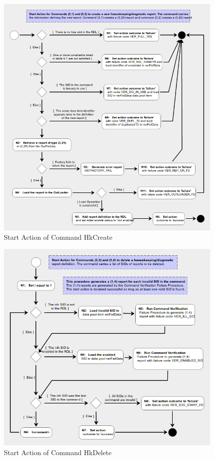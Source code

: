 \documentclass[a4paper,10pt]{article}
\begin{document}
\begin{figure}[H]
 \centering
 \includegraphics[scale=0.55,keepaspectratio=true]{CrPsCmd3s1Start.png}
 \caption{Start Action of Command HkCreate}
 \label{fig:Cmd3s1Start}
\end{figure}

\begin{figure}[H]
 \centering
 \includegraphics[scale=0.55,keepaspectratio=true]{CrPsCmd3s3Start.png}
 \caption{Start Action of Command HkDelete}
 \label{fig:Cmd3s3Start}
\end{figure}
\end{document}
